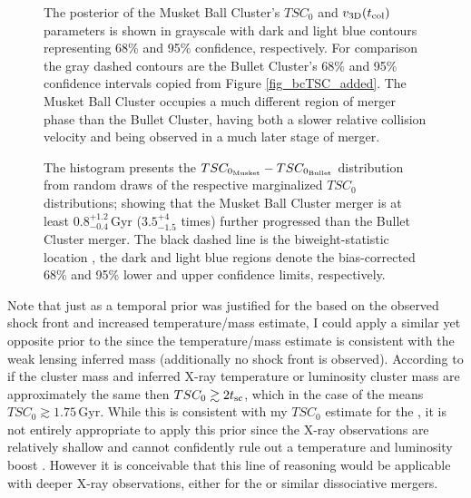 \documentclass[12pt]{emulateapj}
\begin{document}
\begin{figure}
\caption{
The posterior of the Musket Ball Cluster's $TSC_0$ and $v_{\rm 3D}(t_{\rm col})$ parameters is shown in grayscale with dark and light blue contours representing 68\% and 95\% confidence, respectively.
For comparison the gray dashed contours are the Bullet Cluster's 68\% and 95\% confidence intervals copied from Figure \ref{fig_bcTSC_added}.
The Musket Ball Cluster occupies a much different region of merger phase than the Bullet Cluster, having both a slower relative collision velocity and being observed in a much later stage of merger.
\label{fig_mbc_TSC}}
\end{figure}

\begin{figure}
\caption{
The histogram presents the $TSC_{\rm 0_{Musket}}-TSC_{\rm 0_{Bullet}}$ distribution from random draws of the respective marginalized $TSC_0$ distributions; showing that the Musket Ball Cluster merger is at least $0.8^{+1.2}_{-0.4}$\,Gyr ($3.5^{+4}_{-1.5}$ times) further progressed than the Bullet Cluster merger.
The black dashed line is the biweight-statistic location \citep{Beers:1982dp}, the 
dark and light blue regions denote the bias-corrected  68\% and 95\% lower and upper confidence limits, respectively.
\label{fig_TSC0comparison}}
\end{figure}

Note that just as a temporal prior was justified for the  based on the observed shock front and increased temperature/mass estimate, I could apply a similar yet opposite prior to the  since the temperature/mass estimate is consistent with the weak lensing inferred mass (additionally no shock front is observed).  
According to \citet{Randall:2002kk} if the cluster mass and inferred X-ray temperature or luminosity cluster mass are approximately the same then $TSC_0 \gtrsim 2 t_{\rm sc}$, which in the case of the  means $TSC_0 \gtrsim 1.75$\,Gyr.
While this is consistent with my $TSC_0$ estimate for the , it is not entirely appropriate to apply this prior since the X-ray observations are relatively shallow and cannot confidently rule out a temperature and luminosity boost \citep{Dawson:2012dl}.
However it is conceivable that this line of reasoning would be applicable with deeper X-ray observations, either for the  or similar dissociative mergers.
\end{document}
